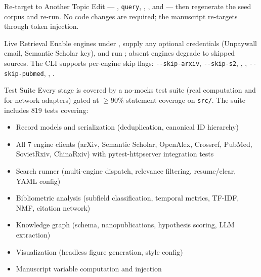 \documentclass[
  ignorenonframetext,
]{beamer}
\providecommand{\tightlist}{%
  \setlength{\itemsep}{0pt}\setlength{\parskip}{0pt}}
\begin{document}
\begin{frame}{Re-target to Another Topic}
\protect{}\label{re-target-to-another-topic}
Edit  ---
, \texttt{query},
, , and
 --- then regenerate the seed corpus and
re-run. No code changes are required; the manuscript re-targets through
token injection.
\end{frame}

\begin{frame}{Live Retrieval}
\protect{}\label{live-retrieval}
Enable engines under , supply any
optional credentials (Unpaywall email, Semantic Scholar key), and run
; absent engines degrade to
skipped sources. The CLI supports per-engine skip flags:
\texttt{-\/-skip-arxiv}, \texttt{-\/-skip-s2},
, ,
\texttt{-\/-skip-pubmed}, ,
.
\end{frame}

\begin{frame}{Test Suite}
\protect{}\label{test-suite}
Every stage is covered by a no-mocks test suite (real computation and
 for network adapters) gated at \(\geq 90\%\)
statement coverage on \texttt{src/}. The suite includes 819 tests
covering:

\begin{itemize}
\tightlist
\item
  Record models and serialization (deduplication, canonical ID
  hierarchy)
\item
  All 7 engine clients (arXiv, Semantic Scholar, OpenAlex, Crossref,
  PubMed, SovietRxiv, ChinaRxiv) with pytest-httpserver integration
  tests
\item
  Search runner (multi-engine dispatch, relevance filtering,
  resume/clear, YAML config)
\item
  Bibliometric analysis (subfield classification, temporal metrics,
  TF-IDF, NMF, citation network)
\item
  Knowledge graph (schema, nanopublications, hypothesis scoring, LLM
  extraction)
\item
  Visualization (headless figure generation, style config)
\item
  Manuscript variable computation and injection
\end{itemize}
\end{frame}
\end{document}
